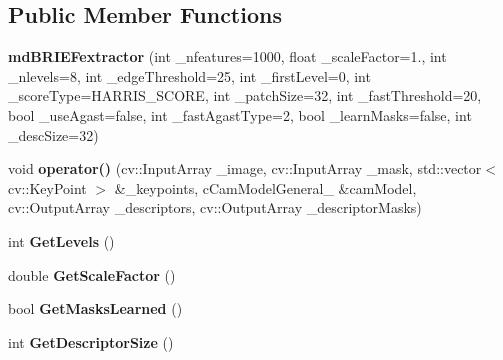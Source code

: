 \subsection*{Public Member Functions}
\begin{DoxyCompactItemize}
\item 
{\bfseries md\+B\+R\+I\+E\+Fextractor} (int \+\_\+nfeatures=1000, float \+\_\+scale\+Factor=1., int \+\_\+nlevels=8, int \+\_\+edge\+Threshold=25, int \+\_\+first\+Level=0, int \+\_\+score\+Type=H\+A\+R\+R\+I\+S\+\_\+\+S\+C\+O\+RE, int \+\_\+patch\+Size=32, int \+\_\+fast\+Threshold=20, bool \+\_\+use\+Agast=false, int \+\_\+fast\+Agast\+Type=2, bool \+\_\+learn\+Masks=false, int \+\_\+desc\+Size=32)\hypertarget{classmdBRIEFextractor_aa27776bf46a0c9577c1b7cb996deea60}{}\label{classmdBRIEFextractor_aa27776bf46a0c9577c1b7cb996deea60}

\item 
void {\bfseries operator()} (cv\+::\+Input\+Array \+\_\+image, cv\+::\+Input\+Array \+\_\+mask, std\+::vector$<$ cv\+::\+Key\+Point $>$ \&\+\_\+keypoints, c\+Cam\+Model\+General\+\_\+ \&cam\+Model, cv\+::\+Output\+Array \+\_\+descriptors, cv\+::\+Output\+Array \+\_\+descriptor\+Masks)\hypertarget{classmdBRIEFextractor_a156d65fed08bcb31eafca1fb8f3ba2b7}{}\label{classmdBRIEFextractor_a156d65fed08bcb31eafca1fb8f3ba2b7}

\item 
int {\bfseries Get\+Levels} ()\hypertarget{classmdBRIEFextractor_a77a55b01f8c829bc5a402ed984a636ab}{}\label{classmdBRIEFextractor_a77a55b01f8c829bc5a402ed984a636ab}

\item 
double {\bfseries Get\+Scale\+Factor} ()\hypertarget{classmdBRIEFextractor_a2fc1fac3f793191e1e7de1b5b6c3062c}{}\label{classmdBRIEFextractor_a2fc1fac3f793191e1e7de1b5b6c3062c}

\item 
bool {\bfseries Get\+Masks\+Learned} ()\hypertarget{classmdBRIEFextractor_a0f0028be442cff90f0da8cf7956c0ee3}{}\label{classmdBRIEFextractor_a0f0028be442cff90f0da8cf7956c0ee3}

\item 
int {\bfseries Get\+Descriptor\+Size} ()\hypertarget{classmdBRIEFextractor_a6f343fc7ead5bb8714a483fad353e977}{}\label{classmdBRIEFextractor_a6f343fc7ead5bb8714a483fad353e977}

\end{DoxyCompactItemize}
